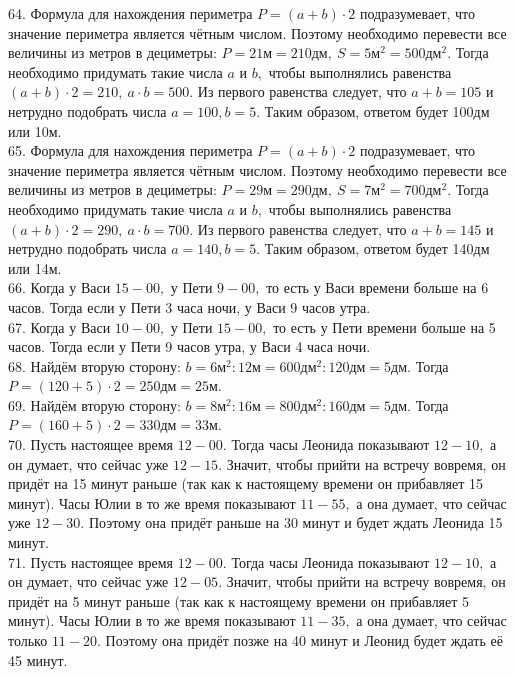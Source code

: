 \documentclass[12pt]{article}
\begin{document}
64. Формула для нахождения периметра $P=(a+b)\cdot2$ подразумевает, что значение периметра является чётным числом. Поэтому необходимо перевести все величины из метров в дециметры: $P=21\text{м}=210\text{дм},\ S=5\text{м}^2=500\text{дм}^2.$ Тогда необходимо придумать такие числа $a$ и $b,$ чтобы выполнялись равенства $(a+b)\cdot2=210,\ a\cdot b=500.$ Из первого равенства следует, что $a+b=105$ и нетрудно подобрать числа $a=100, b=5.$ Таким образом, ответом будет 100дм или 10м.\\
65. Формула для нахождения периметра $P=(a+b)\cdot2$ подразумевает, что значение периметра является чётным числом. Поэтому необходимо перевести все величины из метров в дециметры: $P=29\text{м}=290\text{дм},\ S=7\text{м}^2=700\text{дм}^2.$ Тогда необходимо придумать такие числа $a$ и $b,$ чтобы выполнялись равенства $(a+b)\cdot2=290,\ a\cdot b=700.$ Из первого равенства следует, что $a+b=145$ и нетрудно подобрать числа $a=140, b=5.$ Таким образом, ответом будет 140дм или 14м.\\
66. Когда у Васи $15-00,$ у Пети $9-00,$ то есть у Васи времени больше на 6 часов. Тогда если у Пети 3 часа ночи, у Васи 9 часов утра.\\
67. Когда у Васи $10-00,$ у Пети $15-00,$ то есть у Пети времени больше на 5 часов. Тогда если у Пети 9 часов утра, у Васи 4 часа ночи.\\
68. Найдём вторую сторону: $b=6\text{м}^2:12\text{м}=600\text{дм}^2:120\text{дм}=5\text{дм}.$ Тогда $P=(120+5)\cdot2=250\text{дм}=25\text{м}.$\\
69. Найдём вторую сторону: $b=8\text{м}^2:16\text{м}=800\text{дм}^2:160\text{дм}=5\text{дм}.$ Тогда $P=(160+5)\cdot2=330\text{дм}=33\text{м}.$\\
70. Пусть настоящее время $12-00.$ Тогда часы Леонида показывают $12-10,$ а он думает, что сейчас уже $12-15.$ Значит, чтобы прийти на встречу вовремя, он придёт на 15 минут раньше (так как к настоящему времени он прибавляет 15 минут). Часы Юлии в то же время показывают $11-55,$ а она думает, что сейчас уже $12-30.$ Поэтому она придёт раньше на 30 минут и будет ждать Леонида 15 минут.\\
71. Пусть настоящее время $12-00.$ Тогда часы Леонида показывают $12-10,$ а он думает, что сейчас уже $12-05.$ Значит, чтобы прийти на встречу вовремя, он придёт на 5 минут раньше (так как к настоящему времени он прибавляет 5 минут). Часы Юлии в то же время показывают $11-35,$ а она думает, что сейчас только $11-20.$ Поэтому она придёт позже на 40 минут и Леонид будет ждать её 45 минут.\\
\end{document}
